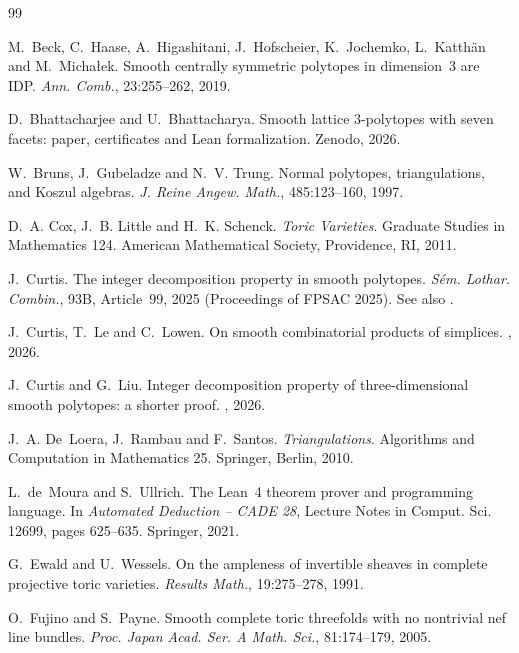 \documentclass[12pt]{article}
\newcommand{\zenodoID}{10.5281/zenodo.23387693}
\begin{document}
{\raggedright
\begin{thebibliography}{99}

M.~Beck, C.~Haase, A.~Higashitani, J.~Hofscheier, K.~Jochemko, L.~Katth\"an and M.~Micha\l ek.
Smooth centrally symmetric polytopes in dimension~3 are IDP.
\emph{Ann. Comb.}, 23:255--262, 2019. 

D.~Bhattacharjee and U.~Bhattacharya.
Smooth lattice 3-polytopes with seven facets: paper, certificates and Lean formalization.
Zenodo, 2026. \doi{\zenodoID}

W.~Bruns, J.~Gubeladze and N.~V. Trung.
Normal polytopes, triangulations, and Koszul algebras.
\emph{J. Reine Angew. Math.}, 485:123--160, 1997. 

D.~A. Cox, J.~B. Little and H.~K. Schenck.
\emph{Toric Varieties}.
Graduate Studies in Mathematics 124. American Mathematical Society, Providence, RI, 2011. 

J.~Curtis.
The integer decomposition property in smooth polytopes.
\emph{S\'em. Lothar. Combin.}, 93B, Article~99, 2025 (Proceedings of FPSAC 2025). See also .

J.~Curtis, T.~Le and C.~Lowen.
On smooth combinatorial products of simplices.
, 2026.

J.~Curtis and G.~Liu.
Integer decomposition property of three-dimensional smooth polytopes: a shorter proof.
, 2026.

J.~A. De~Loera, J.~Rambau and F.~Santos.
\emph{Triangulations}.
Algorithms and Computation in Mathematics 25. Springer, Berlin, 2010. 

L.~de~Moura and S.~Ullrich.
The Lean~4 theorem prover and programming language.
In \emph{Automated Deduction -- CADE 28}, Lecture Notes in Comput. Sci. 12699, pages 625--635. Springer, 2021. 

G.~Ewald and U.~Wessels.
On the ampleness of invertible sheaves in complete projective toric varieties.
\emph{Results Math.}, 19:275--278, 1991. 

O.~Fujino and S.~Payne.
Smooth complete toric threefolds with no nontrivial nef line bundles.
\emph{Proc. Japan Acad. Ser. A Math. Sci.}, 81:174--179, 2005. 


\end{thebibliography}}
\end{document}
